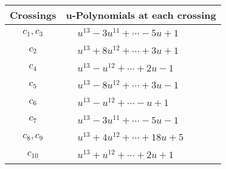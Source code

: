\documentclass[1p]{elsarticle_modified}
\theoremstyle{definition}
\begin{document}
\begin{tabular}{m{50pt}|m{274pt}}
Crossings & \hspace{64pt}u-Polynomials at each crossing \\
\hline $$\begin{aligned}c_{1},c_{3}\end{aligned}$$&$\begin{aligned}
&u^{13}-3 u^{11}+\cdots-5 u+1
\end{aligned}$\\
\hline $$\begin{aligned}c_{2}\end{aligned}$$&$\begin{aligned}
&u^{13}+8 u^{12}+\cdots+3 u+1
\end{aligned}$\\
\hline $$\begin{aligned}c_{4}\end{aligned}$$&$\begin{aligned}
&u^{13}- u^{12}+\cdots+2 u-1
\end{aligned}$\\
\hline $$\begin{aligned}c_{5}\end{aligned}$$&$\begin{aligned}
&u^{13}-8 u^{12}+\cdots+3 u-1
\end{aligned}$\\
\hline $$\begin{aligned}c_{6}\end{aligned}$$&$\begin{aligned}
&u^{13}- u^{12}+\cdots- u+1
\end{aligned}$\\
\hline $$\begin{aligned}c_{7}\end{aligned}$$&$\begin{aligned}
&u^{13}-3 u^{11}+\cdots-5 u-1
\end{aligned}$\\
\hline $$\begin{aligned}c_{8},c_{9}\end{aligned}$$&$\begin{aligned}
&u^{13}+4 u^{12}+\cdots+18 u+5
\end{aligned}$\\
\hline $$\begin{aligned}c_{10}\end{aligned}$$&$\begin{aligned}
&u^{13}+u^{12}+\cdots+2 u+1
\end{aligned}$\\

\end{tabular}
\end{document}
